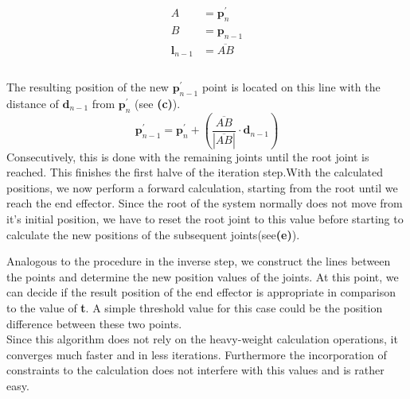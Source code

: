 \begin{equation}
\begin{split}
A&=\textbf{p}_{n}^{'}\\
B&=\textbf{p}_{n-1}\\
\textbf{l}_{n-1}&=\overline{AB}\\
\end{split}
\end{equation}
\\The resulting position of the new $\textbf{p}_{n-1}^{'}$ point is located on this line with the distance of $\textbf{d}_{n-1}$ from $\textbf{p}_{n}^{'}$ (see \textbf{(c)}).\\
\begin{equation}
\textbf{p}_{n-1}^{'}= \textbf{p}_{n}^{'}+ \left(\frac{\overline{AB}}{|\overline{AB}|}\cdot\textbf{d}_{n-1}\right)
\end{equation}
Consecutively, this is done with the remaining joints until the root joint is reached.
This finishes the first halve of the iteration step.With the calculated positions, we now perform a forward calculation, starting from the root until we reach the end effector. Since the root of the system normally does not move from it's initial position, we have to reset the root joint to this value before starting to calculate the new positions of the subsequent joints(see\textbf{(e)}).

Analogous to the procedure in the inverse step, we construct the lines between the points and determine the new position values of the joints. At this point, we can decide if the result position of the end effector is appropriate in comparison to the value of \textbf{t}. A simple threshold value for this case could be the position difference between these two points.
\\Since this algorithm does not rely on the heavy-weight calculation operations, it converges much faster and in less iterations. Furthermore the incorporation of constraints to the calculation does not interfere with this values and is rather easy.